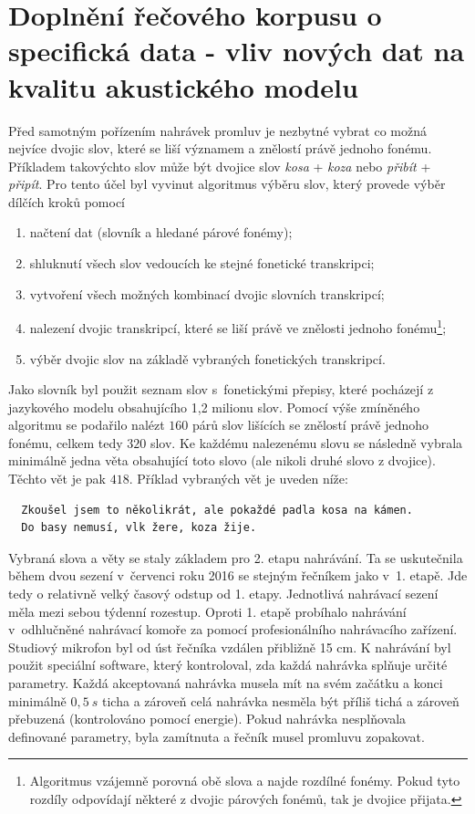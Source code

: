 \section{Doplnění řečového korpusu o specifická data - vliv nových dat na kvalitu akustického modelu}
\label{chap:realisation:corpus}

Před samotným pořízením nahrávek promluv je nezbytné vybrat co možná nejvíce dvojic slov, které se liší významem a znělostí právě jednoho fonému.
Příkladem takovýchto slov může být dvojice slov \textit{kosa} + \textit{koza} nebo \textit{přibít} + \textit{připít}.
Pro tento účel byl vyvinut algoritmus výběru slov, který provede výběr dílčích kroků pomocí

\begin{enumerate}
  \item načtení dat (slovník a hledané párové fonémy);
  \item shluknutí všech slov vedoucích ke stejné fonetické transkripci;
  \item vytvoření všech možných kombinací dvojic slovních transkripcí;
  \item nalezení dvojic transkripcí, které se liší právě ve znělosti jednoho fonému\footnote{Algoritmus vzájemně porovná obě slova a najde rozdílné fonémy. Pokud tyto rozdíly odpovídají některé z dvojic párových fonémů, tak je dvojice přijata.};
  \item výběr dvojic slov na základě vybraných fonetických transkripcí.
\end{enumerate}

\noindent Jako slovník byl použit seznam slov s~fonetickými přepisy, které pocházejí z jazykového modelu obsahujícího 1,2 milionu slov.
Pomocí výše zmíněného algoritmu se podařilo nalézt $160$ párů slov lišících se znělostí právě jednoho fonému, celkem tedy $320$ slov.
Ke každému nalezenému slovu se následně vybrala minimálně jedna věta obsahující toto slovo (ale nikoli druhé slovo z dvojice).
Těchto vět je pak $418$. Příklad vybraných vět je uveden níže:

\begin{verbatim}
  Zkoušel jsem to několikrát, ale pokaždé padla kosa na kámen.
  Do basy nemusí, vlk žere, koza žije.
\end{verbatim}

Vybraná slova a věty se staly základem pro 2. etapu nahrávání.
Ta se uskutečnila během dvou sezení v~červenci roku 2016 se stejným řečníkem jako v~1. etapě.
Jde tedy o relativně velký časový odstup od 1. etapy.
Jednotlivá nahrávací sezení měla mezi sebou týdenní rozestup.
Oproti 1. etapě probíhalo nahrávání v~odhlučněné nahrávací komoře za pomocí profesionálního nahrávacího zařízení.
Studiový mikrofon byl od úst řečníka vzdálen přibližně 15 cm.
K nahrávání byl použit speciální software, který kontroloval, zda každá nahrávka splňuje určité parametry.
Každá akceptovaná nahrávka musela mít na svém začátku a konci minimálně $0,5\ s$ ticha a zároveň celá nahrávka nesměla být příliš tichá a zároveň přebuzená (kontrolováno pomocí energie).
Pokud nahrávka nesplňovala definované parametry, byla zamítnuta a řečník musel promluvu zopakovat.

